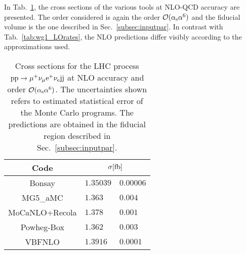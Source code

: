 In Tab.~\ref{tab:wg1_NLOrates}, the cross sections of the various tools at NLO-QCD accuracy are presented.
The order considered is again the order $\mathcal{O}(\alpha_{\rm s}\alpha^6)$ and the fiducial volume is the one described in Sec.~\ref{subsec:inputpar}.
In contrast with Tab.~\ref{tab:wg1_LOrates}, the NLO predictions differ visibly according to the approximations used.

\begin{table}[h!]
    \centering
    \begin{tabular}{c|r@{ $\pm$ }l}
      Code  &  \multicolumn{2}{c}{$\sigma[\rm{fb}]$}  \\
        \hline
        \hline
        {\sc Bonsay}  &  $1.35039$ & $0.00006$  \\
        {\sc MG5\_aMC}&  $1.363\phantom{0}\phantom{0}$ & $0.004$  \\
        {\sc MoCaNLO+Recola}  &  $ 1.378\phantom{0}\phantom{0}$ & $0.001$ \\
        {\sc Powheg-Box}  &  $1.362\phantom{0}\phantom{0}$  & $0.003$   \\
        {\sc VBFNLO}  &  $1.3916\phantom{0}$ & $0.0001$  \\
    \end{tabular}
    \caption{\label{tab:wg1_NLOrates} Cross sections for the LHC process ${\rm p}{\rm p}\to\mu^+\nu_\mu{\rm e}^+\nu_{\rm e}{\rm j}{\rm j}$ at NLO accuracy and order $\mathcal{O}(\alpha_\text{s}\alpha^6)$.
    The uncertainties shown refers to estimated statistical error of the Monte Carlo programs.
    The predictions are obtained in the fiducial region described in Sec.~\ref{subsec:inputpar}.
    }
\end{table}

